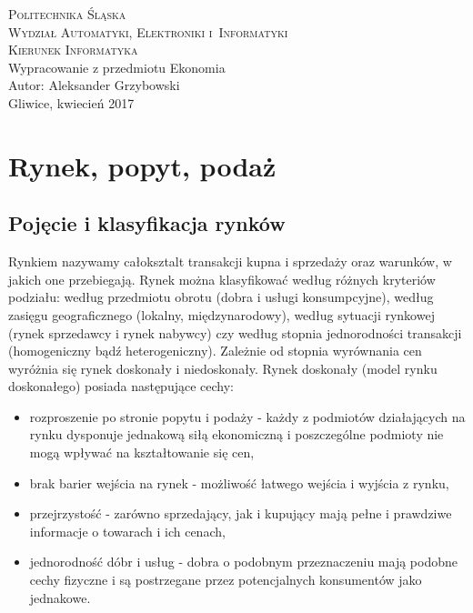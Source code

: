 \documentclass[12pt]{extarticle}
\begin{document}
\begin{titlepage}
    \begin{center}
        \textsc{\LARGE{Politechnika Śląska}}\\[0.5cm]
        \textsc{\LARGE{Wydział Automatyki, Elektroniki i~Informatyki}}\\[0.5cm]
        \textsc{\LARGE{Kierunek Informatyka}}\\[5.5cm]
        \LARGE{Wypracowanie z przedmiotu Ekonomia}\\[1cm]
        \LARGE{Autor: Aleksander Grzybowski}\\[1cm]
        \LARGE{Gliwice, kwiecień 2017}\\[1cm]
    \end{center}
\end{titlepage}



\section{Rynek, popyt, podaż}

\subsection{Pojęcie i klasyfikacja rynków}

Rynkiem nazywamy całoksztalt transakcji kupna i sprzedaży oraz warunków, w jakich one przebiegają. Rynek można klasyfikować według różnych kryteriów podziału: według przedmiotu obrotu (dobra i usługi konsumpcyjne), według zasięgu geograficznego (lokalny, międzynarodowy), według sytuacji rynkowej (rynek sprzedawcy i rynek nabywcy) czy według stopnia jednorodności transakcji (homogeniczny bądź heterogeniczny). Zależnie od stopnia wyrównania cen wyróżnia się rynek doskonały i niedoskonały. Rynek doskonały (model rynku doskonałego) posiada następujące cechy:

\begin{itemize}
	\item rozproszenie po stronie popytu i podaży - każdy z podmiotów działających na rynku dysponuje jednakową siłą ekonomiczną i poszczególne podmioty nie mogą wpływać na kształtowanie się cen,
	\item brak barier wejścia na rynek - możliwość łatwego wejścia i wyjścia z rynku,
	\item przejrzystość - zarówno sprzedający, jak i kupujący mają pełne i prawdziwe informacje o towarach i ich cenach,
	\item jednorodność dóbr i usług - dobra o podobnym przeznaczeniu mają podobne cechy fizyczne i są postrzegane przez potencjalnych konsumentów jako jednakowe.
\end{itemize}
\end{document}

